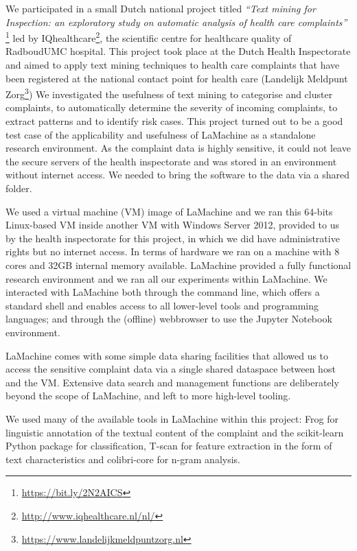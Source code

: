 \documentclass[a4paper,11pt]{article}
\begin{document}
We participated in a small Dutch national project titled \emph{``Text mining for Inspection: an exploratory study on
automatic analysis of health care complaints''} \footnote{\url{https://bit.ly/2N2AICS}} %
led by IQhealthcare\footnote{\url{http://www.iqhealthcare.nl/nl/}}, the scientific centre for healthcare quality of RadboudUMC hospital.
This project took place at the Dutch Health Inspectorate and aimed to apply text mining techniques to health care
complaints that have been registered at the national contact point for health care (Landelijk Meldpunt
Zorg\footnote{\url{https://www.landelijkmeldpuntzorg.nl}})
We investigated the usefulness of text mining to categorise and cluster complaints, to automatically determine the
severity of incoming complaints, to extract patterns  and to identify risk cases. This project turned out to be a good
test case of the applicability and usefulness of LaMachine as a standalone research environment.
As the complaint data is highly sensitive, it could not leave the secure servers of the health inspectorate and was
stored in an environment without internet access. We needed to bring the software to the data via a shared folder.

We used a virtual machine (VM) image of LaMachine and we ran this 64-bits Linux-based VM inside another
VM with Windows Server 2012, provided to us by the health inspectorate for this project, in which we did have administrative
rights but no internet access. In terms of hardware we ran on a machine with 8 cores and  32GB internal memory available.
LaMachine provided a fully functional research environment and we ran all our experiments within LaMachine. We interacted with LaMachine both through the command line, which offers a standard
shell and enables access to all lower-level tools and programming languages; and through the (offline) webbrowser to use
the Jupyter Notebook environment.

LaMachine comes with some simple data sharing facilities that allowed us to access the sensitive complaint data via a
single shared dataspace between host and the VM. Extensive data search and management functions are deliberately beyond the scope of LaMachine, and left to more high-level tooling.

We used many of the available tools in LaMachine within this project: Frog for linguistic annotation of the textual
content of the complaint and the scikit-learn Python package for classification, T-scan for feature extraction in the form of text characteristics and colibri-core for n-gram analysis.
\end{document}
